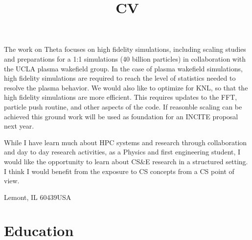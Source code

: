 \documentclass[11pt,a4paper,sans]{moderncv}        %
\begin{document}
The work on Theta focuses on high fidelity simulations, 
including scaling studies and preparations for a 1:1 simulations
 (40 billion particles) in collaboration with the UCLA plasma wakefield group. 
 In the case of plasma wakefield simulations, high fidelity simulations are 
 required to reach the level of statistics needed to resolve the plasma behavior.
 We would also like to optimize for KNL, so that the high fidelity simulations
 are more efficient. This requires updates to the FFT, particle push routine, and
 other aspects of the code. If reasonble scaling can be achieved this 
 ground work will be used as foundation for an INCITE proposal next year.
 
 While I have learn much about HPC systems and research through collaboration and 
 day to day research activities, as a Physics and first engineering student, 
 I would like the opportunity to learn about CS\&E research in a structured setting.
 I think I would benefit from the exposure to CS concepts from a CS point of view.


\makeletterclosing


\clearpage

\title{CV}                               %
\address{9700 Cass Avenue}{Lemont, IL 60439}{USA}%
\makecvtitle

\section{Education}

\iffalse
\section{Ph.D Thesis}
\cvitem{Title}{\emph{Design for Staged Two Beam Acceleration at the Argonne Wakefield Accelerator}}
\cvitem{Advisors}{Linda Spentzouris, John Power}
\cvitem{Summary}{
	Staged two beam acceleration using dielectric structures has yet to 
	be achieved anywhere in the world. In this thesis, I discuss beam 
	line design, simulation, and optimization, of a 
	beam line with the potential for dielectric two beam acceleration.
    Preliminary and prepratory experimental measurements
    are included.    }
\fi
\end{document}
